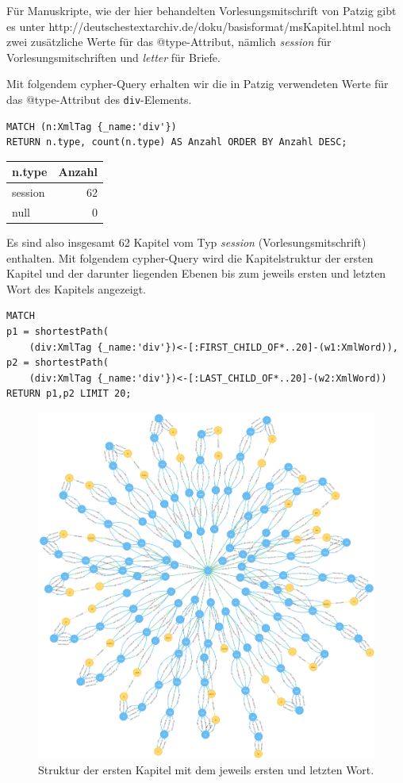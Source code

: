 \documentclass[ngerman,]{scrreprt}
\begin{document}
Für Manuskripte, wie der hier behandelten Vorlesungsmitschrift von Patzig gibt es unter http://deutschestextarchiv.de/doku/basisformat/msKapitel.html noch zwei zusätzliche Werte für das @type-Attribut, nämlich \emph{session} für Vorlesungsmitschriften und \emph{letter} für Briefe.

Mit folgendem cypher-Query erhalten wir die in Patzig verwendeten Werte für das @type-Attribut des \texttt{div}-Elements.

\begin{verbatim}
MATCH (n:XmlTag {_name:'div'})
RETURN n.type, count(n.type) AS Anzahl ORDER BY Anzahl DESC;
\end{verbatim}

\begin{longtable}[]{@{}lr@{}}
\toprule
n.type & Anzahl\tabularnewline
\midrule
\endhead
session & 62\tabularnewline
null & 0\tabularnewline
\bottomrule
\end{longtable}

Es sind also insgesamt 62 Kapitel vom Typ \emph{session} (Vorlesungsmitschrift) enthalten. Mit folgendem cypher-Query wird die Kapitelstruktur der ersten Kapitel und der darunter liegenden Ebenen bis zum jeweils ersten und letzten Wort des Kapitels angezeigt.

\begin{verbatim}
MATCH
p1 = shortestPath(
    (div:XmlTag {_name:'div'})<-[:FIRST_CHILD_OF*..20]-(w1:XmlWord)),
p2 = shortestPath(
    (div:XmlTag {_name:'div'})<-[:LAST_CHILD_OF*..20]-(w2:XmlWord))
RETURN p1,p2 LIMIT 20;
\end{verbatim}

\begin{figure}
\centering
\includegraphics{Bilder/TEI2Graph/div-Struktur-XmlWord.png}
\caption{Struktur der ersten Kapitel mit dem jeweils ersten und letzten Wort.}
\end{figure}
\end{document}
